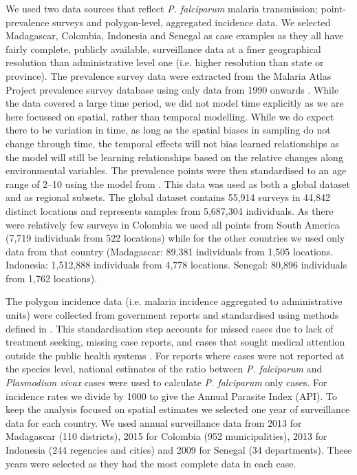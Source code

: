 \documentclass[review]{elsarticle}
\begin{document}
We used two data sources that reflect \emph{P. falciparum} malaria transmission; point-prevalence surveys and polygon-level, aggregated incidence data. 
We selected Madagascar, Colombia, Indonesia and Senegal as case examples as they all have fairly complete, publicly available, surveillance data at a finer geographical resolution than administrative level one (i.e. higher resolution than state or province).
The prevalence survey data were extracted from the Malaria Atlas Project prevalence survey database using only data from 1990 onwards \citep{bhatt2015effect, guerra2007assembling, pfeffer2018ma}.
While the data covered a large time period, we did not model time explicitly as we are here focussed on spatial, rather than temporal modelling.
While we do expect there to be variation in time, as long as the spatial biases in sampling do not change through time, the temporal effects will not bias learned relationships as the model will still be learning relationships based on the relative changes along environmental variables.
The prevalence points were then standardised to an age range of 2--10 using the model from \citep{smith2007standardizing}.
This data was used as both a global dataset and as regional subsets.
The global dataset contains 55,914 surveys in 44,842 distinct locations and represents samples from 5,687,304 individuals.
As there were relatively few surveys in Colombia we used all points from South America (7,719 individuals from 522 locations) while for the other countries we used only data from that country (Madagascar: 89,381 individuals from 1,505 locations. Indonesia: 1,512,888 individuals from 4,778 locations. Senegal: 80,896 individuals from 1,762 locations).


The polygon incidence data (i.e. malaria incidence aggregated to administrative units) were collected from government reports \citep{mdg, sen, col, idn} and standardised using methods defined in \cite{cibulskis2011worldwide}.
This standardisation step accounts for missed cases due to lack of treatment seeking, missing case reports, and cases that sought medical attention outside the public health systems \citep{battle2016treatment}.
For reports where cases were not reported at the species level, national estimates of the ratio between \emph{P. falciparum} and \emph{Plasmodium vivax} cases were used to calculate \emph{P. falciparum} only cases. 
For incidence rates we divide by 1000 to give the Annual Parasite Index (API).
To keep the analysis focused on spatial estimates we selected one year of surveillance data for each country. 
We used annual surveillance data from 2013 for Madagascar (110 districts), 2015 for Colombia (952 municipalities), 2013 for Indonesia (244 regencies and cities) and 2009 for Senegal (34 departments).
These years were selected as they had the most complete data in each case.
\end{document}

